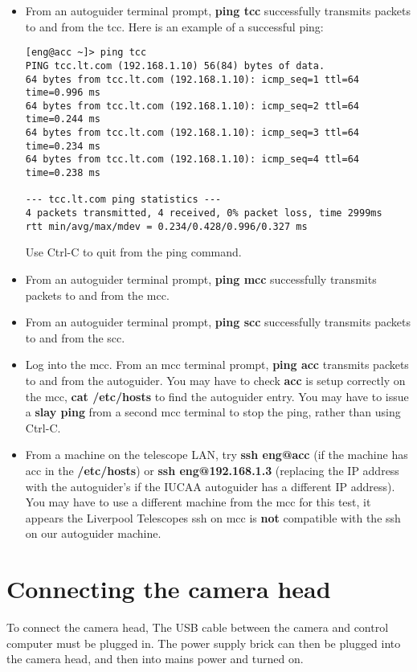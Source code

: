 \documentclass[10pt,a4paper]{article}
\begin{document}
\begin{itemize}
\item From an autoguider terminal prompt, {\bf ping tcc} successfully transmits packets to and from the tcc. Here is an example of a successful ping:
\begin{verbatim}
[eng@acc ~]> ping tcc
PING tcc.lt.com (192.168.1.10) 56(84) bytes of data.
64 bytes from tcc.lt.com (192.168.1.10): icmp_seq=1 ttl=64 time=0.996 ms
64 bytes from tcc.lt.com (192.168.1.10): icmp_seq=2 ttl=64 time=0.244 ms
64 bytes from tcc.lt.com (192.168.1.10): icmp_seq=3 ttl=64 time=0.234 ms
64 bytes from tcc.lt.com (192.168.1.10): icmp_seq=4 ttl=64 time=0.238 ms

--- tcc.lt.com ping statistics ---
4 packets transmitted, 4 received, 0% packet loss, time 2999ms
rtt min/avg/max/mdev = 0.234/0.428/0.996/0.327 ms
\end{verbatim}
Use Ctrl-C to quit from the ping command.
\item From an autoguider terminal prompt, {\bf ping mcc} successfully transmits packets to and from the mcc.
\item From an autoguider terminal prompt, {\bf ping scc} successfully transmits packets to and from the scc.
\item Log into the mcc. From an mcc terminal prompt, {\bf ping acc} transmits packets to and from the autoguider. You may have to check {\bf acc} is setup correctly on the mcc, {\bf cat /etc/hosts} to find the autoguider entry. You may have to issue a {\bf slay ping} from a second mcc terminal to stop the ping, rather than using Ctrl-C.
\item From a machine on the telescope LAN, try {\bf ssh eng@acc} (if the machine has acc in the {\bf /etc/hosts}) or {\bf ssh eng@192.168.1.3} (replacing the IP address with the autoguider's if the IUCAA autoguider has a different IP address). You may have to use a different machine from the mcc for this test, it appears the Liverpool Telescopes ssh on mcc is {\bf not} compatible with the ssh on our autoguider machine. 
\end{itemize}

\section{Connecting the camera head}

To connect the camera head, The USB cable between the camera and control computer must be plugged in. The power supply brick can then be plugged into the camera head, and then into mains power and turned on.
\end{document}
